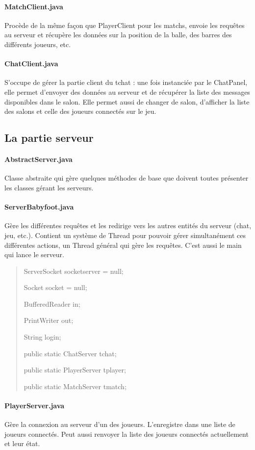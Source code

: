 \documentclass[a4paper,12pt]{report}
\begin{document}
\paragraph{MatchClient.java}
Procède de la même façon que PlayerClient pour les matchs, envoie les requêtes au serveur et récupère les données sur la position de la balle, des barres des différents joueurs, etc.
\paragraph{ChatClient.java}
S'occupe de gérer la partie client du tchat : une fois instanciée par le ChatPanel, elle permet d'envoyer des données au serveur et de récupérer la liste des messages disponibles dans le salon. Elle permet aussi de changer de salon, d'afficher la liste des salons et celle des joueurs connectés sur le jeu.
\subsection{La partie serveur}
\paragraph{AbstractServer.java}
Classe abstraite qui gère quelques méthodes de base que doivent toutes présenter les classes gérant les serveurs.
\paragraph{ServerBabyfoot.java}
Gère les différentes requêtes et les redirige vers les autres entités du serveur (chat, jeu, etc.). Contient un système de Thread pour pouvoir gérer simultanément ces différentes actions, un Thread général qui gère les requêtes. C'est aussi le main qui lance le serveur.
\begin{quote}
    ServerSocket socketserver = null;
    
	Socket socket = null;
    
	BufferedReader in;
    
	PrintWriter out;
    
	String login;
    
	public static ChatServer tchat;
    
	public static PlayerServer tplayer;
    
	public static MatchServer tmatch;
\end{quote}
\paragraph{PlayerServer.java}
Gère la connexion au serveur d'un des joueurs. L'enregistre dans une liste de joueurs connectés. Peut aussi renvoyer la liste des joueurs connectés actuellement et leur état.
\end{document}
